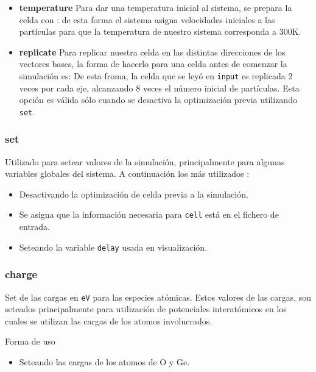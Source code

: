 \begin{itemize}
 \item \textbf{temperature}
Para dar una temperatura inicial al sistema, se prepara la celda con :
de esta forma el sistema asigna velocidades iniciales a las part\'iculas para que la temperatura de nuestro sistema corresponda a 300K.
 \item \textbf{replicate}
Para replicar nuestra celda en las distintas direcciones de los vectores bases, la forma de hacerlo para una celda antes de comenzar la simulaci\'on es:
De esta froma, la celda que se ley\'o en \verb|input| es replicada 2 veces por cada eje, alcanzando 8 veces el n\'umero inicial de part\'iculas. Esta opci\'on es v\'alida s\'olo cuando se desactiva la optimizaci\'on previa utilizando \verb|set|.
\end{itemize}

\subsubsection{set}
Utilizado para setear valores de la simulaci\'on, principalmente para algunas variables globales del sistema. A continuaci\'on los m\'as utilizados :

\begin{itemize}
 \item Desactivando la optimizaci\'on de celda previa a la simulaci\'on.
 \item Se asigna que la informaci\'on necesaria para \texttt{cell} est\'a en el fichero de entrada.
 \item Seteando la variable \texttt{delay} usada en visualizaci\'on.
\end{itemize}

\subsubsection{charge}
Set de las cargas en \verb|eV| para las especies at\'omicas. Estos valores de las cargas, son seteados principalmente para utilizaci\'on de potenciales interat\'omicos en los cuales se utilizan las cargas de los atomos involucrados.


Forma de uso

\begin{itemize}
 \item Seteando las cargas de los atomos de O y Ge.
\end{itemize}

